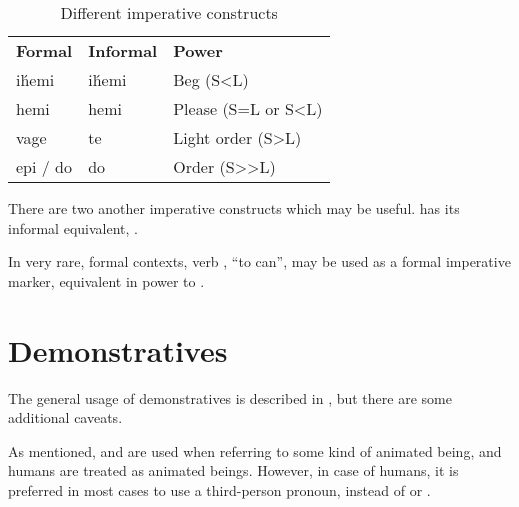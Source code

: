 \begin{table}[]
    \caption{Different imperative constructs}
    \label{tab:imperative}
    \begin{tabular}{lll}
        \textbf{Formal} & \textbf{Informal} & \textbf{Power}      \\
        ih́emi           & ih́emi             & Beg (S<L)           \\
        hemi            & hemi              & Please (S=L or S<L) \\
        vage            & te                & Light order (S>L)   \\
        epi / do        & do                & Order (S>>L)        \\
    \end{tabular}
\end{table}

There are two another imperative constructs which may be useful.  has
its informal equivalent, .


In very rare, formal contexts, verb , ``to can'', may be used as a
formal imperative marker, equivalent in power to .



\section{Demonstratives}
\label{sec:demonstratives}

The general usage of demonstratives is described in , but there
are some additional caveats.

As mentioned,  and  are used when referring to some kind
of animated being, and humans are treated as animated beings. However, in case
of humans, it is preferred in most cases to use a third-person pronoun, instead
of  or .


